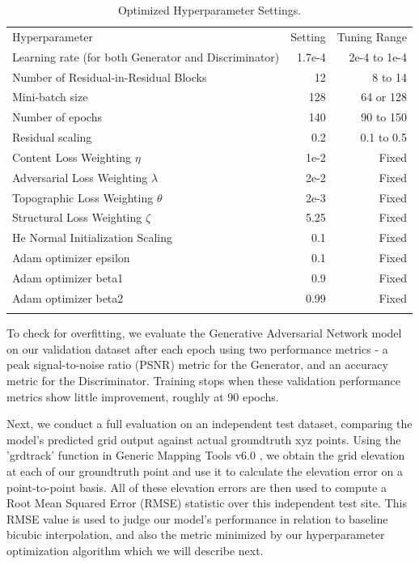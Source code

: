 \documentclass[tc, manuscript]{copernicus}
\begin{document}
\begin{table}[h]
\caption{Optimized Hyperparameter Settings.}
\label{table:1}
\begin{tabular}{lrr}
\tophline
Hyperparameter & Setting & Tuning Range \\
\middlehline
Learning rate (for both Generator and Discriminator) & 1.7e-4 & 2e-4 to 1e-4 \\
Number of Residual-in-Residual Blocks & 12 & 8 to 14 \\
Mini-batch size & 128 & 64 or 128 \\
Number of epochs & 140 & 90 to 150 \\
Residual scaling & 0.2 & 0.1 to 0.5 \\
Content Loss Weighting $\eta$ & 1e-2 & Fixed \\
Adversarial Loss Weighting $\lambda$ & 2e-2 & Fixed \\
Topographic Loss Weighting $\theta$ & 2e-3 & Fixed \\
Structural Loss Weighting $\zeta$ & 5.25 & Fixed \\
He Normal Initialization Scaling & 0.1 & Fixed \\
Adam optimizer epsilon & 0.1 & Fixed \\
Adam optimizer beta1 & 0.9 & Fixed \\
Adam optimizer beta2 & 0.99 & Fixed \\
\bottomhline
\end{tabular}
\belowtable{} %
\end{table}

To check for overfitting, we evaluate the Generative Adversarial Network model on our validation dataset after each epoch using two performance metrics - a peak signal-to-noise ratio (PSNR) metric for the Generator, and an accuracy metric for the Discriminator.
Training stops when these validation performance metrics show little improvement, roughly at 90 epochs.

Next, we conduct a full evaluation on an independent test dataset, comparing the model's predicted grid output against actual groundtruth xyz points.
Using the 'grdtrack' function in Generic Mapping Tools v6.0 \citep{WesselGenericMappingTools2019}, we obtain the grid elevation at each of our groundtruth point and use it to calculate the elevation error on a point-to-point basis.
All of these elevation errors are then used to compute a Root Mean Squared Error (RMSE) statistic over this independent test site.
This RMSE value is used to judge our model's performance in relation to baseline bicubic interpolation, and also the metric minimized by our hyperparameter optimization algorithm which we will describe next.
\end{document}
